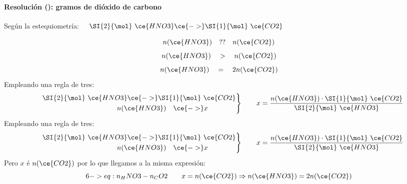 \begin{frame}
    \frametitle{\ejerciciocmd}
    \framesubtitle{Resolución (): gramos de dióxido de carbono}
     \textbf{}
     Según la estequiometría: $\quad\SI{2}{\mol}~\ce{HNO3}\ce{->}\SI{1}{\mol}~\ce{CO2}$\\[.3cm]
    \begin{overprint}
            $$
                n(\ce{HNO3})
                \quad ??\quad 
                n(\ce{CO2})
            $$
            $$
                n(\ce{HNO3})
                \quad >\quad
                n(\ce{CO2})
            $$
            $$
                n(\ce{HNO3})
                \quad =\quad
                2n(\ce{CO2})
            $$
            Empleando una regla de tres:
            $$
                \left.
                \begin{aligned}
                    \quad\SI{2}{\mol}~\ce{HNO3}\ce{->}\SI{1}{\mol}~\ce{CO2}\\
                    \quad n(\ce{HNO3})\quad\ce{->}x\qquad\qquad
                \end{aligned}
                \right\}
                \qquad x = \frac{n(\ce{HNO3})\cdot\SI{1}{\mol}~\ce{CO2}}{\SI{2}{\mol}~\ce{HNO3}}
            $$
            Empleando una regla de tres:
            $$
                \left.
                \begin{aligned}
                    \quad\SI{2}{\mol}~\ce{HNO3}\ce{->}\SI{1}{\mol}~\ce{CO2}\\
                    \quad n(\ce{HNO3})\quad\ce{->}x\qquad\qquad
                \end{aligned}
                \right\}
                \qquad x = \frac{n(\ce{HNO3})\cdot\SI{1}{\mol}~\ce{CO2}}{\SI{2}{\mol}~\ce{HNO3}}
            $$
            Pero $x$ é $n(\ce{CO2})$ por lo que llegamos a la misma expresión:
            \begin{equation}\label<6->{eq:n_HNO3-n_CO2}
                \qquad x = n(\ce{CO2})\Rightarrow n(\ce{HNO3}) = 2n(\ce{CO2})            
            \end{equation}
    \end{overprint}
\end{frame}
